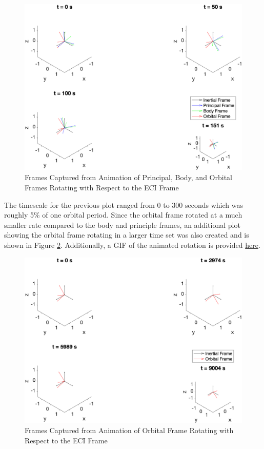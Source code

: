 \begin{figure}[H]
    \centering
    \captionsetup{justification  = centering}
    \includegraphics[width = 15cm]{Images/reference_frame_motion_EA.png}
    \caption{Frames Captured from Animation of Principal, Body, and Orbital Frames Rotating with Respect to the ECI Frame}
    \label{fig:frame_rotation}
\end{figure}

The timescale for the previous plot ranged from 0 to 300 seconds which was roughly 5\% of one orbital period. Since the orbital frame rotated at a much smaller rate compared to the body and principle frames, an additional plot showing the orbital frame rotating in a larger time set was also created and is shown in Figure \ref{fig:frame_rotation_orbital}. Additionally, a GIF of the animated rotation is provided \href{https://github.com/riordk626/AA279C-AQUA/blob/main/Images/reference_frame_gif_orbital_EA.gif}{here}.

\begin{figure}[H]
    \centering
    \captionsetup{justification  = centering}
    \includegraphics[width = 15cm]{Images/reference_frame_motion_orbital_EA.png}
    \caption{Frames Captured from Animation of Orbital Frame Rotating with Respect to the ECI Frame}
    \label{fig:frame_rotation_orbital}
\end{figure}